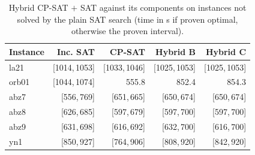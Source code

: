 \begin{table}[t]
\centering
\small
\begin{tabular}{lrrrr}
\toprule
Instance & Inc. SAT & CP-SAT & Hybrid B & Hybrid C \\
\midrule
la21 & [1014,\,1053] & [1033,\,1046] & [1025,\,1053] & [1025,\,1053] \\
orb01 & [1044,\,1074] & 555.8 & 852.4 & 854.3 \\
abz7 & [556,\,769] & [651,\,665] & [650,\,674] & [650,\,674] \\
abz8 & [626,\,685] & [597,\,679] & [597,\,700] & [597,\,700] \\
abz9 & [631,\,698] & [616,\,692] & [632,\,700] & [616,\,700] \\
yn1 & [850,\,927] & [764,\,906] & [808,\,920] & [842,\,920] \\
\bottomrule
\end{tabular}
\caption{Hybrid CP-SAT $+$ SAT against its components on instances not solved by the plain SAT search (time in s if proven optimal, otherwise the proven interval).}\label{tab:hybrid}
\end{table}
